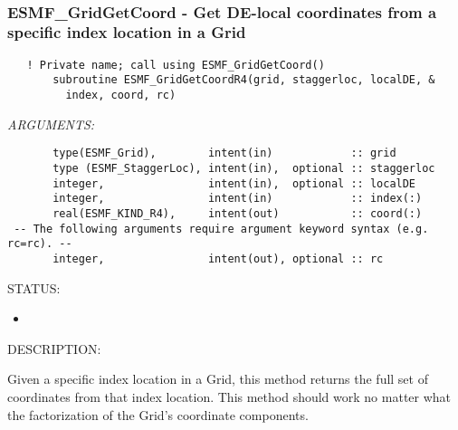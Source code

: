  
\mbox{}\hrulefill\ 
 

  \label{API:GridGetCoordR4}\subsubsection [ESMF\_GridGetCoord] {ESMF\_GridGetCoord - Get DE-local coordinates from a specific index location in a Grid}


 
\begin{verbatim}   ! Private name; call using ESMF_GridGetCoord()
       subroutine ESMF_GridGetCoordR4(grid, staggerloc, localDE, &
         index, coord, rc)\end{verbatim}{\em ARGUMENTS:}
\begin{verbatim}       type(ESMF_Grid),        intent(in)            :: grid
       type (ESMF_StaggerLoc), intent(in),  optional :: staggerloc
       integer,                intent(in),  optional :: localDE
       integer,                intent(in)            :: index(:)
       real(ESMF_KIND_R4),     intent(out)           :: coord(:)
 -- The following arguments require argument keyword syntax (e.g. rc=rc). --
       integer,                intent(out), optional :: rc\end{verbatim}
{\sf STATUS:}
   \begin{itemize}
   \item{}
   \end{itemize}
  
{\sf DESCRIPTION:\\ }


       Given a specific index location in a Grid, this method returns the full set
     of coordinates from that index location. This method should work no matter what
     the factorization of the Grid's coordinate components.
  
